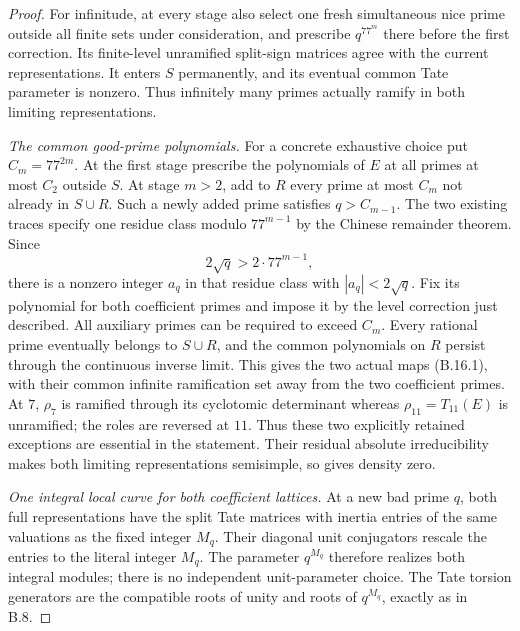 \begin{proof}
For infinitude, at every stage also select one fresh simultaneous
nice prime outside all finite sets under consideration, and
prescribe $q^{77^m}$ there before the first correction.
Its finite-level unramified split-sign matrices agree with the
current representations.  It enters $S$ permanently, and its
eventual common Tate parameter is nonzero.  Thus infinitely
many primes actually ramify in both limiting representations.

\emph{The common good-prime polynomials.}
For a concrete exhaustive choice put $C_m=77^{2m}$.
At the first stage prescribe the polynomials of $E$ at all
primes at most $C_2$ outside $S$.
At stage $m>2$, add to $R$ every prime at most $C_m$ not
already in $S\cup R$.  Such a newly added prime satisfies
$q>C_{m-1}$.  The two existing traces specify one residue
class modulo $77^{m-1}$ by the Chinese remainder theorem.
Since
\[
                  2\sqrt q>2\cdot77^{m-1},
 \tag{B.16.8}
\]
there is a nonzero integer $a_q$ in that residue class with
$|a_q|<2\sqrt q$.  Fix its polynomial for both coefficient
primes and impose it by the level correction just described.
All auxiliary primes can be required to exceed $C_m$.
Every rational prime eventually belongs to $S\cup R$,
and the common polynomials on $R$ persist through the
continuous inverse limit.  This gives the two actual maps
(B.16.1), with their common infinite ramification set away
from the two coefficient primes.  At $7$, $\rho_7$ is
ramified through its cyclotomic determinant whereas
$\rho_{11}=T_{11}(E)$ is unramified; the roles are reversed
at $11$.  Thus these two explicitly retained exceptions
are essential in the statement.
Their residual absolute irreducibility makes both limiting
representations semisimple, so
\cite[Theorem~1]{BIR_KhareRajan2001} gives density zero.

\emph{One integral local curve for both coefficient lattices.}
At a new bad prime $q$, both full representations have the
split Tate matrices with inertia entries of the same valuations
as the fixed integer $M_q$.  Their diagonal unit conjugators
rescale the entries to the literal integer $M_q$.
The parameter $q^{M_q}$ therefore realizes both integral
modules; there is no independent unit-parameter choice.
The Tate torsion generators are the compatible roots of unity
and roots of $q^{M_q}$, exactly as in B.8.


\end{proof}
